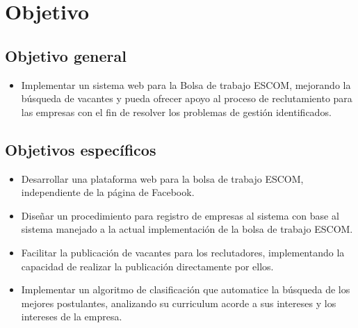 \section{Objetivo}
\subsection{Objetivo general}
\begin{itemize}
    \item Implementar un sistema web para la Bolsa de trabajo ESCOM, mejorando la búsqueda de vacantes y pueda 
    ofrecer apoyo al proceso de reclutamiento para las empresas con el fin de resolver los problemas de gestión 
    identificados.
\end{itemize}

\subsection{Objetivos específicos}
        \begin{itemize}
            \item Desarrollar una plataforma web para la bolsa de trabajo ESCOM, independiente de la página de Facebook.
            \item Diseñar un procedimiento para registro de empresas al sistema con base al sistema manejado a la actual
            implementación de la bolsa de trabajo ESCOM.
            \item Facilitar la publicación de vacantes para los reclutadores, implementando la capacidad de realizar la
            publicación directamente por ellos.
            \item Implementar un algoritmo de clasificación que automatice la búsqueda de los mejores postulantes, analizando
            su curriculum acorde a sus intereses y los intereses de la empresa.
        \end{itemize}


        
